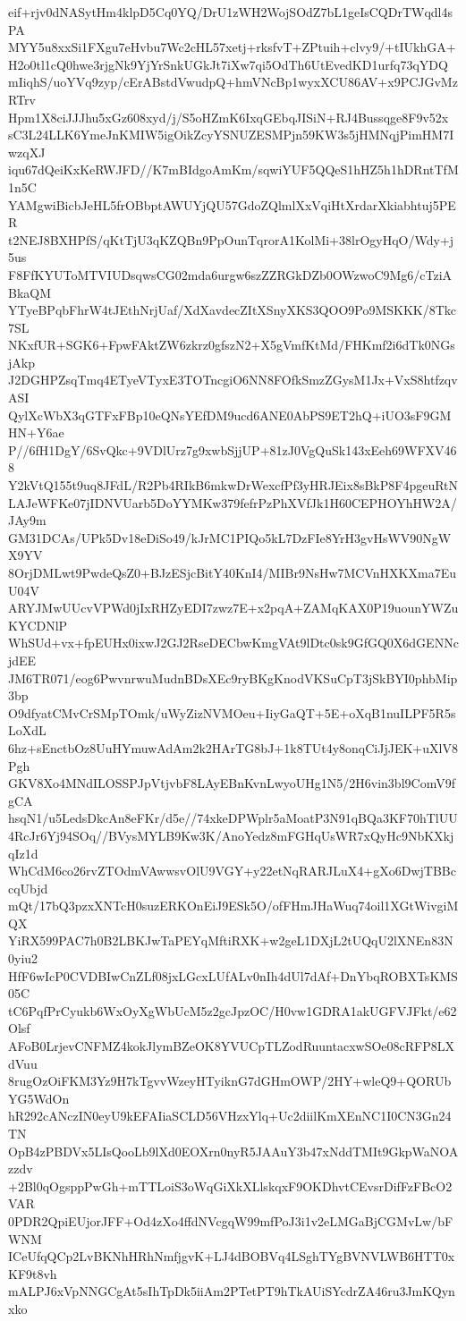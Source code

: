 eif+rjv0dNASytHm4klpD5Cq0YQ/DrU1zWH2WojSOdZ7bL1geIsCQDrTWqdl4sPA
MYY5u8xxSi1FXgu7eHvbu7Wc2cHL57xetj+rksfvT+ZPtuih+clvy9/+tIUkhGA+
H2o0tl1cQ0hwe3rjgNk9YjYrSnkUGkJt7iXw7qi5OdTh6UtEvedKD1urfq73qYDQ
mIiqhS/uoYVq9zyp/cErABstdVwudpQ+hmVNcBp1wyxXCU86AV+x9PCJGvMzRTrv
Hpm1X8ciJJJhu5xGz608xyd/j/S5oHZmK6IxqGEbqJISiN+RJ4Bussqge8F9v52x
sC3L24LLK6YmeJnKMIW5igOikZcyYSNUZESMPjn59KW3s5jHMNqjPimHM7IwzqXJ
iqu67dQeiKxKeRWJFD//K7mBIdgoAmKm/sqwiYUF5QQeS1hHZ5h1hDRntTfM1n5C
YAMgwiBicbJeHL5frOBbptAWUYjQU57GdoZQlmlXxVqiHtXrdarXkiabhtuj5PER
t2NEJ8BXHPfS/qKtTjU3qKZQBn9PpOunTqrorA1KolMi+38lrOgyHqO/Wdy+j5us
F8FfKYUToMTVIUDsqwsCG02mda6urgw6szZZRGkDZb0OWzwoC9Mg6/cTziABkaQM
YTyeBPqbFhrW4tJEthNrjUaf/XdXavdecZItXSnyXKS3QOO9Po9MSKKK/8Tkc7SL
NKxfUR+SGK6+FpwFAktZW6zkrz0gfszN2+X5gVmfKtMd/FHKmf2i6dTk0NGsjAkp
J2DGHPZsqTmq4ETyeVTyxE3TOTncgiO6NN8FOfkSmzZGysM1Jx+VxS8htfzqvASI
QylXcWbX3qGTFxFBp10eQNsYEfDM9ucd6ANE0AbPS9ET2hQ+iUO3sF9GMHN+Y6ae
P//6fH1DgY/6SvQkc+9VDlUrz7g9xwbSjjUP+81zJ0VgQuSk143xEeh69WFXV468
Y2kVtQ155t9uq8JFdL/R2Pb4RIkB6mkwDrWexcfPf3yHRJEix8sBkP8F4pgeuRtN
LAJeWFKe07jIDNVUarb5DoYYMKw379fefrPzPhXVfJk1H60CEPHOYhHW2A/JAy9m
GM31DCAs/UPk5Dv18eDiSo49/kJrMC1PIQo5kL7DzFIe8YrH3gvHsWV90NgWX9YV
8OrjDMLwt9PwdeQsZ0+BJzESjcBitY40KnI4/MIBr9NsHw7MCVnHXKXma7EuU04V
ARYJMwUUcvVPWd0jIxRHZyEDI7zwz7E+x2pqA+ZAMqKAX0P19uounYWZuKYCDNlP
WhSUd+vx+fpEUHx0ixwJ2GJ2RseDECbwKmgVAt9lDtc0sk9GfGQ0X6dGENNcjdEE
JM6TR071/eog6PwvnrwuMudnBDsXEc9ryBKgKnodVKSuCpT3jSkBYI0phbMip3bp
O9dfyatCMvCrSMpTOmk/uWyZizNVMOeu+IiyGaQT+5E+oXqB1nuILPF5R5sLoXdL
6hz+sEnctbOz8UuHYmuwAdAm2k2HArTG8bJ+1k8TUt4y8onqCiJjJEK+uXlV8Pgh
GKV8Xo4MNdILOSSPJpVtjvbF8LAyEBnKvnLwyoUHg1N5/2H6vin3bl9ComV9fgCA
hsqN1/u5LedsDkcAn8eFKr/d5e//74xkeDPWplr5aMoatP3N91qBQa3KF70hTlUU
4RcJr6Yj94SOq//BVysMYLB9Kw3K/AnoYedz8mFGHqUsWR7xQyHc9NbKXkjqIz1d
WhCdM6co26rvZTOdmVAwwsvOlU9VGY+y22etNqRARJLuX4+gXo6DwjTBBccqUbjd
mQt/17bQ3pzxXNTcH0suzERKOnEiJ9ESk5O/ofFHmJHaWuq74oil1XGtWivgiMQX
YiRX599PAC7h0B2LBKJwTaPEYqMftiRXK+w2geL1DXjL2tUQqU2lXNEn83N0yiu2
HfF6wIcP0CVDBIwCnZLf08jxLGcxLUfALv0nIh4dUl7dAf+DnYbqROBXTsKMS05C
tC6PqfPrCyukb6WxOyXgWbUcM5z2gcJpzOC/H0vw1GDRA1akUGFVJFkt/e62Olsf
AFoB0LrjevCNFMZ4kokJlymBZeOK8YVUCpTLZodRuuntacxwSOe08cRFP8LXdVuu
8rugOzOiFKM3Yz9H7kTgvvWzeyHTyiknG7dGHmOWP/2HY+wleQ9+QORUbYG5WdOn
hR292cANczIN0eyU9kEFAIiaSCLD56VHzxYlq+Uc2diilKmXEnNC1I0CN3Gn24TN
OpB4zPBDVx5LIsQooLb9lXd0EOXrn0nyR5JAAuY3b47xNddTMIt9GkpWaNOAzzdv
+2Bl0qOgsppPwGh+mTTLoiS3oWqGiXkXLlskqxF9OKDhvtCEvsrDifFzFBcO2VAR
0PDR2QpiEUjorJFF+Od4zXo4ffdNVcgqW99mfPoJ3i1v2eLMGaBjCGMvLw/bFWNM
ICeUfqQCp2LvBKNhHRhNmfjgvK+LJ4dBOBVq4LSghTYgBVNVLWB6HTT0xKF9t8vh
mALPJ6xVpNNGCgAt5sIhTpDk5iiAm2PTetPT9hTkAUiSYcdrZA46ru3JmKQynxko
